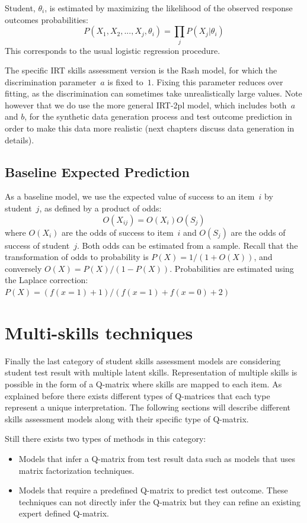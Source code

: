 Student, $\theta_i$, is estimated by maximizing the likelihood of the observed response outcomes probabilities:
\[ P(X_1, X_2, ..., X_j, \theta_i) = \prod_j P(X_j|\theta_i) \]
This corresponds to the usual logistic regression procedure.

The specific IRT skills assessment version is the Rash model, for which the discrimination parameter~$a$ is fixed to~$1$.  Fixing this parameter reduces over fitting, as the discrimination can sometimes take unrealistically large values. Note however that we do use the more general IRT-2pl model, which includes both~$a$ and $b$, for the synthetic data generation process and test outcome prediction in order to make this data more realistic (next chapters discuss data generation in details).

\subsection{Baseline Expected Prediction}

As a baseline model, we use the expected value of success to an item~$i$ by student~$j$, as defined by a product of odds:
\[ O(X_{ij}) =  O(X_i) O(S_j) \]
where $O(X_i)$ are the odds of success to item~$i$ and $O(S_j)$ are the odds of success of student~$j$.  Both odds can be estimated from a sample.  Recall that the transformation of odds to probability is $P(X) = 1/(1+O(X))$, and conversely $O(X) = P(X)/(1 - P(X))$. Probabilities are estimated using the Laplace correction: $P(X) = (f(x\!=\!1) + 1) / (f(x\!=\!1) + f(x\!=\!0) + 2)$


\section{Multi-skills techniques}

Finally the last category of student skills assessment models are considering student test result with multiple latent skills. Representation of multiple skills is possible in the form of a Q-matrix where skills are mapped to each item. As explained before there exists different types of Q-matrices that each type represent a unique interpretation. The following sections will describe different skills assessment models along with their specific type of Q-matrix.


Still there exists two types of methods in this category: 
\begin{itemize}
\item Models that infer a Q-matrix from test result data such as models that uses matrix factorization techniques.
\item Models that require a predefined Q-matrix to predict test outcome. These techniques can not directly infer the Q-matrix but they can refine an existing expert defined Q-matrix.
\end{itemize}

